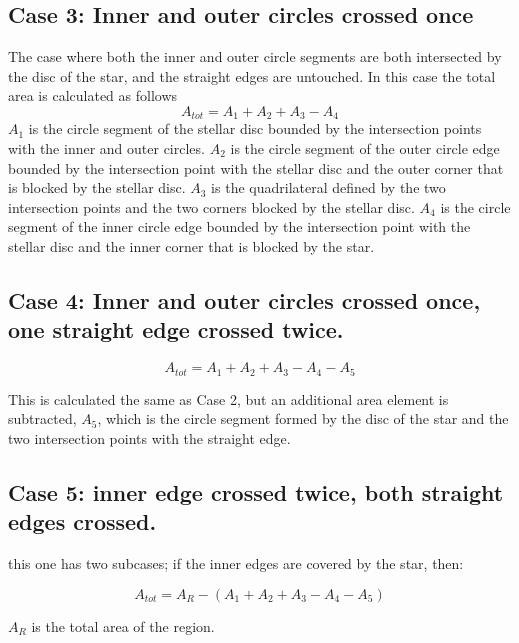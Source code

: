 \documentclass[a4paper,fleqn,usenatbib]{mnras}
\begin{document}
\subsection*{Case 3: Inner and outer circles crossed once}
The case where both the inner and outer circle segments are both intersected by the disc of the star, and the straight edges are untouched. In this case the total area is calculated as follows
\begin{equation} \label{eq:inner_outer}
A_{tot} = A_1 + A_2 + A_3 - A_4
\end{equation}
$A_1$ is the circle segment of the stellar disc bounded by the intersection points with the inner and outer circles. $A_2$ is the circle segment of the outer circle edge bounded by the intersection point with the stellar disc and the outer corner that is blocked by the stellar disc. $A_3$ is the quadrilateral defined by the two intersection points and the two corners blocked by the stellar disc. $A_4$ is the circle segment of the inner circle edge bounded by the intersection point with the stellar disc and the inner corner that is blocked by the star. 

\subsection*{Case 4: Inner and outer circles crossed once, one straight edge crossed twice.}

\begin{equation} \label{eq:inner_outer}
A_{tot} = A_1 + A_2 + A_3 - A_4 - A_5
\end{equation}

This is calculated the same as Case 2, but an additional area element is subtracted, $A_5$, which is the circle segment formed by the disc of the star and the two intersection points with the straight edge.

\subsection*{Case 5: inner edge crossed twice, both straight edges crossed.}

this one has two subcases; if the inner edges are covered by the star, then:

\begin{equation} \label{eq:inner_outer}
A_{tot} = A_R - (A_1 + A_2 + A_3 - A_4 - A_5)
\end{equation}

$A_R$ is the total area of the region.
\end{document}
